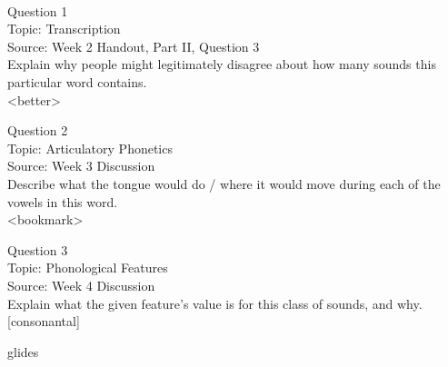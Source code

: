 \documentclass[12pt]{article}
\begin{document}
\newpage

\begin{center}
\textbf{{\color{red}{\HUGE END OF EXAM}}}\\

\end{center}
\newpage

\begin{center}
\textbf{{\color{blue}{\HUGE START OF EXAM\\}}}

\textbf{{\color{blue}{\HUGE Student ID: 17487\\}}}

\textbf{{\color{blue}{\HUGE \\}}}

\end{center}
\newpage

{\large Question 1}\\

Topic: Transcription\\
Source: Week 2 Handout, Part II, Question 3\\

Explain why people might legitimately disagree about how many sounds this particular word contains.\\

<better>


\newpage

{\large Question 2}\\

Topic: Articulatory Phonetics\\
Source: Week 3 Discussion\\

Describe what the tongue would do / where it would move during each of the vowels in this word.\\

<bookmark>


\newpage

{\large Question 3}\\

Topic: Phonological Features\\
Source: Week 4 Discussion\\

Explain what the given feature’s value is for this class of sounds, and why.\\

{[consonantal]}

glides


\newpage
\end{document}
